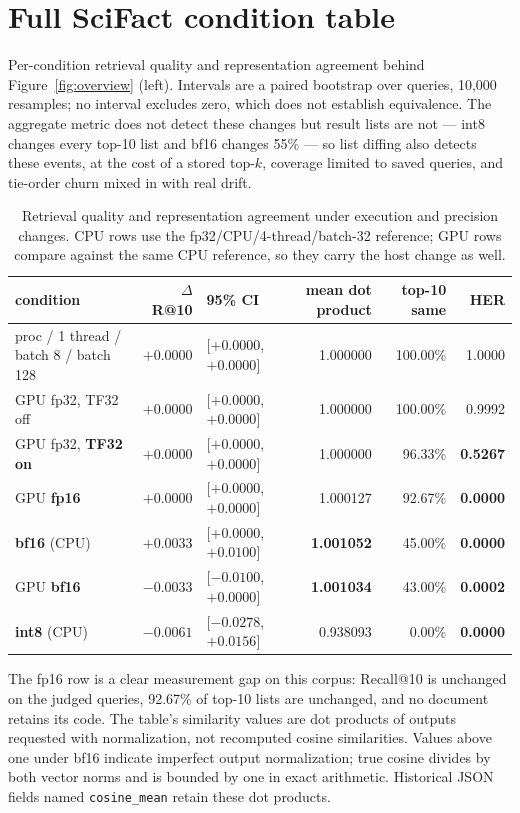 \documentclass{article}
\begin{document}
\section{Full SciFact condition table}\label{app:scifact}

Per-condition retrieval quality and representation agreement behind Figure~\ref{fig:overview} (left). Intervals are a paired bootstrap over queries, 10{,}000 resamples; no interval excludes zero, which does not establish equivalence. The aggregate metric does not detect these changes but result lists are not --- int8 changes every top-10 list and bf16 changes 55\% --- so list diffing also detects these events, at the cost of a stored top-$k$, coverage limited to saved queries, and tie-order churn mixed in with real drift.

\begin{table}[h]
\centering\caption{Retrieval quality and representation agreement under execution and precision changes. CPU rows use the fp32/CPU/4-thread/batch-32 reference; GPU rows compare against the same CPU reference, so they carry the host change as well.}\label{tab:scifact}\scriptsize\setlength{\tabcolsep}{3.5pt}
\begin{tabular}{lrlrrr}
\toprule
condition & $\Delta$R@10 & 95\% CI & mean dot product & top-10 same & HER \\
\midrule
proc / 1 thread / batch 8 / batch 128 & $+0.0000$ & [$+0.0000$, $+0.0000$] & 1.000000 & 100.00\% & 1.0000 \\
GPU fp32, TF32 off & $+0.0000$ & [$+0.0000$, $+0.0000$] & 1.000000 & 100.00\% & 0.9992 \\
GPU fp32, \textbf{TF32 on} & $+0.0000$ & [$+0.0000$, $+0.0000$] & 1.000000 & 96.33\% & \textbf{0.5267} \\
GPU \textbf{fp16} & $+0.0000$ & [$+0.0000$, $+0.0000$] & 1.000127 & 92.67\% & \textbf{0.0000} \\
\textbf{bf16} (CPU) & $+0.0033$ & [$+0.0000$, $+0.0100$] & \textbf{1.001052} & 45.00\% & \textbf{0.0000} \\
GPU \textbf{bf16} & $-0.0033$ & [$-0.0100$, $+0.0000$] & \textbf{1.001034} & 43.00\% & \textbf{0.0002} \\
\textbf{int8} (CPU) & $-0.0061$ & [$-0.0278$, $+0.0156$] & 0.938093 & 0.00\% & \textbf{0.0000} \\
\bottomrule
\end{tabular}
\end{table}

The fp16 row is a clear measurement gap on this corpus: Recall@10 is unchanged on the judged queries, 92.67\% of top-10 lists are unchanged, and no document retains its code. The table's similarity values are dot products of outputs requested with normalization, not recomputed cosine similarities. Values above one under bf16 indicate imperfect output normalization; true cosine divides by both vector norms and is bounded by one in exact arithmetic. Historical JSON fields named \texttt{cosine\_mean} retain these dot products.
\end{document}
